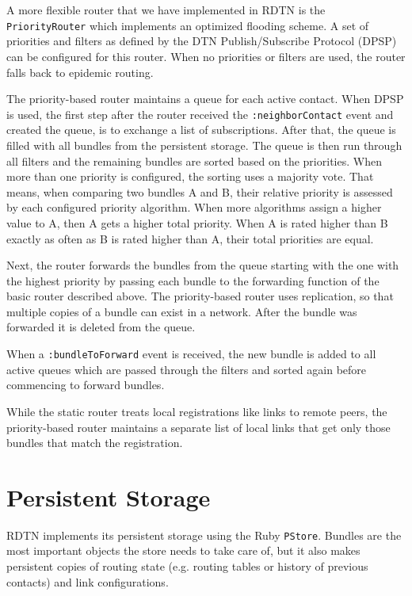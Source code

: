 \documentclass[a4paper]{article}
\begin{document}
A more flexible router that we have implemented in RDTN is the {\tt
PriorityRouter} which implements an optimized flooding scheme. A set of
priorities and filters as defined by the DTN Publish/Subscribe Protocol (DPSP)
\cite{dtn-pubsub} can be configured for this router. When no priorities or
filters are used, the router falls back to epidemic routing\cite{epidemic}.


The priority-based router maintains a queue for each active contact. When DPSP
is used, the first step after the router received the {\tt :neighborContact}
event and created the queue, is to exchange a list of subscriptions.  After
that, the queue is filled with all bundles from the persistent storage. The
queue is then run through all filters and the remaining bundles are sorted based
on the priorities. When more than one priority is configured, the sorting uses a
majority vote. That means, when comparing two bundles A and B, their relative
priority is assessed by each configured priority algorithm. When more algorithms
assign a higher value to A, then A gets a higher total priority. When A is rated
higher than B exactly as often as B is rated higher than A, their total
priorities are equal.

Next, the router forwards the bundles from the queue starting with the one with
the highest priority by passing each bundle to the forwarding function of the
basic router described above. The priority-based router uses replication, so
that multiple copies of a bundle can exist in a network.  After the bundle was
forwarded it is deleted from the queue.

When a {\tt :bundleToForward} event is received, the new bundle is added to all
active queues which are passed through the filters and sorted again before
commencing to forward bundles.

While the static router treats local registrations like links to remote peers,
the priority-based router maintains a separate list of local links that get only
those bundles that match the registration.

\section{Persistent Storage}\label{sec.storage}

RDTN implements its persistent storage using the Ruby {\tt PStore}.
Bundles are the most important objects the store needs to take care of, but
it also makes persistent copies of routing state (e.g. routing
tables or history of previous contacts) and link configurations.
\end{document}
